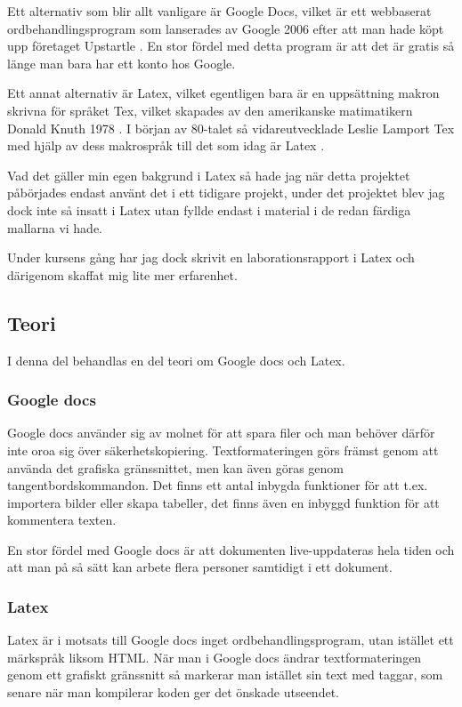 Ett alternativ som blir allt vanligare är Google Docs, vilket är ett webbaserat ordbehandlingsprogram som lanserades av Google 2006 \cite{docs_launch} efter att man hade köpt upp företaget Upstartle \cite{upstartle}. En stor fördel med detta program är att det är gratis så länge man bara har ett konto hos Google.

Ett annat alternativ är Latex, vilket egentligen bara är en uppsättning makron skrivna för språket Tex, vilket skapades av den amerikanske matimatikern Donald Knuth 1978 \cite{donald_knuth}. I början av 80-talet så vidareutvecklade Leslie Lamport Tex med hjälp av dess makrospråk till det som 
idag är Latex \cite{leslie_lamport}.

Vad det gäller min egen bakgrund i Latex så hade jag när detta projektet påbörjades endast använt det i ett tidigare projekt, under det projektet blev jag dock inte så insatt i Latex utan fyllde endast i material i de redan färdiga mallarna vi hade.

Under kursens gång har jag dock skrivit en laborationsrapport i Latex och därigenom skaffat mig lite mer erfarenhet.


\subsection{Teori}
I denna del behandlas en del teori om Google docs och Latex.
\subsubsection{Google docs}
Google docs använder sig av molnet för att spara filer och man behöver därför inte oroa sig över säkerhetskopiering. Textformateringen görs främst genom att använda det grafiska gränssnittet, men kan även göras genom tangentbordskommandon. Det finns ett antal inbygda funktioner för att t.ex. importera bilder eller skapa tabeller, det finns även en inbyggd funktion för att kommentera texten.

En stor fördel med Google docs är att dokumenten live-uppdateras hela tiden och att man på så sätt kan arbete flera personer samtidigt i ett dokument.

\subsubsection{Latex}
Latex är i motsats till Google docs inget ordbehandlingsprogram, utan istället ett märkspråk liksom HTML. När man i Google docs ändrar textformateringen genom ett grafiskt gränssnitt så markerar man istället sin text med taggar, som senare när man kompilerar koden ger det önskade utseendet. 

